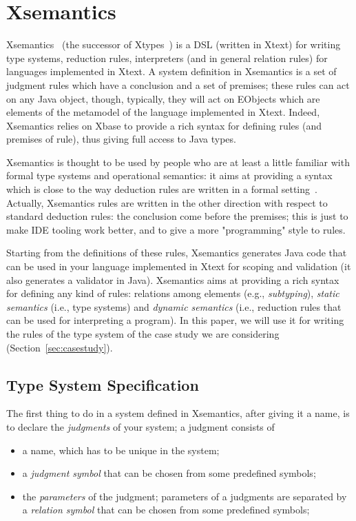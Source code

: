 \section{Xsemantics}
\label{sec:xsemantics}

Xsemantics~\cite{lbts} (the successor of Xtypes~\cite{Bet11}) is a DSL (written
in Xtext) for writing type systems, reduction rules, interpreters (and in
general relation rules) for languages implemented in Xtext.
A system definition in Xsemantics is a set of judgment rules which have a
conclusion and a set of premises; these rules can act on any Java object,
though, typically, they will act on EObjects which are elements of the metamodel
of the language implemented in Xtext.  Indeed, Xsemantics relies on Xbase to
provide a rich syntax for defining rules (and premises of rule), thus giving
full access to Java types.

Xsemantics is thought to be used by people who are at least a little familiar
with formal type systems and operational semantics: it aims at providing
a syntax which is close to the way deduction rules are written in a formal
setting~\cite{hindley:1997a,Pierce02}.
Actually, Xsemantics rules are written in the other direction with respect
to standard deduction rules: the conclusion come before the premises; this is just
to make IDE tooling work better, and to give a more "programming" style to rules.

Starting from the definitions of these rules, Xsemantics generates Java code
that can be used in your language implemented in Xtext for scoping and
validation (it also generates a validator in Java).  Xsemantics aims at
providing a rich syntax for defining any kind of rules: relations among elements
(e.g., \emph{subtyping}), \emph{static semantics} (i.e., type systems) and
\emph{dynamic semantics} (i.e., reduction rules that can be used for
interpreting a program).  In this paper, we will use it for writing the rules of
the type system of the case study we are considering
(Section~\ref{sec:casestudy}).

\subsection{Type System Specification}

The first thing to do in a system defined in Xsemantics, after giving it a name,
is to declare the \emph{judgments} of your system; a judgment consists of

\begin{itemize}
\item 
a name, which has to be unique in the system;
\item 
a \textit{judgment symbol} that can be chosen from some predefined symbols;
\item 
the \textit{parameters} of the judgment; parameters of a judgments are separated by
	a \textit{relation symbol} that can be chosen from some predefined symbols;
\end{itemize}

